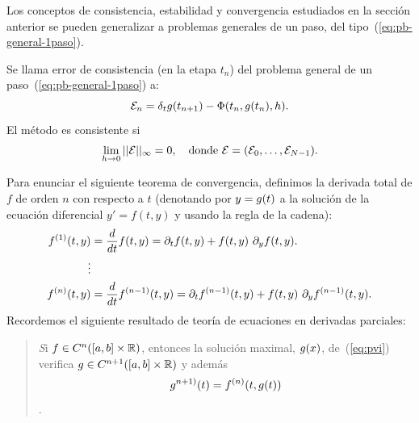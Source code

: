 Los conceptos de consistencia, estabilidad y convergencia estudiados
en la sección anterior se pueden generalizar a problemas generales de
un paso, del tipo~(\ref{eq:pb-general-1paso}).

\begin{definition}
  Se llama error de consistencia (en la etapa $t_n$) del problema
  general de un paso~(\ref{eq:pb-general-1paso}) a:
  $${\cal E}_n=\delta_t g({t_{n+1}}) - \Phi({t_n},g({t_n}),h).$$
  El método es consistente si
  $$
  \lim_{h\to 0} ||{\cal E}||_\infty  = 0, \quad \text{donde } {\cal
    E}=({\cal E}_0,\dots,{\cal E}_{N-1}).
  $$
\end{definition}

\newcommand{\Dtotal}[2]{#2^{(#1)}}%
Para enunciar el siguiente teorema de convergencia, definimos la
derivada total de $f$ de orden $n$ con respecto a $t$ (denotando por
$y=g(t)$ a la solución de la ecuación diferencial $y'=f(t,y)$ y
usando la regla de la cadena):
\begin{align*}
  \Dtotal 1 f(t,y) & = \frac{d}{dt}f(t,y) =
                     \dt f(t,y)
                     + f(t,y)\ \dy f (t,y).
  \\
  \vdots
  \\
  \Dtotal n f(t,y) &= \frac{d}{dt}\Dtotal{n-1}f(t,y) =
                     \dt \Dtotal {n-1} f(t,y)
                     + f(t,y) \ \dy\Dtotal {n-1}f (t,y).
\end{align*}
Recordemos el siguiente resultado de teoría de ecuaciones en derivadas
parciales:
\begin{quotation}
  \emph Si $f\in C^n([a,b]\times\operatorname{{\mathbb R}})$, entonces la solución
  maximal, $g(x)$, de~(\ref{eq:pvi}) verifica $g\in
  C^{n+1}([a,b]\times\operatorname{{\mathbb R}})$ y además $$g^{n+1)}(t)=\Dtotal n f(t,
  \sol(t))$$.
\end{quotation}

